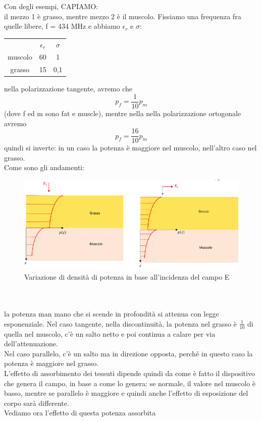 \documentclass[oneside, 12pt]{extbook}
\begin{document}
Con degli esempi, CAPIAMO:\\ il mezzo 1 è grasso, mentre mezzo 2 è il muscolo. Fissiamo una frequenza fra quelle libere, f = 434 MHz e abbiamo $\epsilon_r$ e $\sigma$:
\begin{table}
	\begin{tabular}{|c|c|c|}
		& $\epsilon_r$ & $\sigma$\\
		muscolo & 60 & 1\\
		grasso & 15 & 0,1\\
		
	\end{tabular}
\end{table}
nella polarizzazione tangente, avremo che 
\begin{equation}
	p_f = \frac{1}{10} p_m
\end{equation} (dove f ed m sono fat e muscle), mentre nella nella polarizzazione ortogonale avremo 
\begin{equation}
	p_f = \frac{16}{10} p_m
\end{equation}
quindi si inverte: in un caso la potenza è maggiore nel muscolo, nell'altro caso nel grasso.\\Come sono gli andamenti:
\begin{figure}[!h]
	\includegraphics[scale=0.5]{immagini/disc_mezzi.png}
	\caption{Variazione di densità di potenza in base all'incidenza del campo E}
\end{figure}\\\\
la potenza man mano che si scende in profondità si attenua con legge esponenziale. Nel caso tangente, nella discontinuità, la potenza nel grasso è $\frac{1}{10}$ di quella nel muscolo, c'è un salto netto e poi continua a calare per via dell'attenuazione.\\Nel caso parallelo, c'è un salto ma in direzione opposta, perché in questo caso la potenza è maggiore nel grasso.\\L'effetto di assorbimento dei tessuti dipende quindi da come è fatto il dispositivo che genera il campo, in base a come lo genera: se normale, il valore nel muscolo è basso, mentre se parallelo è maggiore e quindi anche l'effetto di esposizione del corpo sarà differente.\\Vediamo ora l'effetto di questa potenza assorbita
\end{document}
